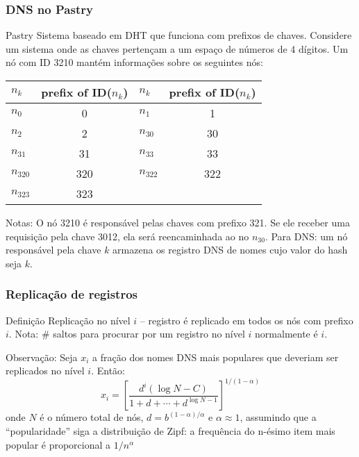 \documentclass[Ligatures=TeX,table,brazil,svgnames,usetotalslideindicator,compress,10pt]{beamer}
\begin{document}
\begin{frame}
  \frametitle{DNS no Pastry}
  \begin{block}{Pastry}
    Sistema baseado em DHT que funciona com \alert{prefixos} de chaves. Considere um sistema onde as chaves pertençam a um espaço de números de 4 dígitos. Um nó com ID 3210 mantém informações sobre os seguintes nós:
  \end{block}
  \begin{center}\footnotesize
      \begin{tabular}{lclc} \\
        $n_k$ & prefix of ID($n_k$) &         $n_k$ & prefix of ID($n_k$) \\ \hline
        $n_0$ & 0  &
        $n_1$ &  1  \\
        $n_2$ &  2  &
        $n_{30}$ &  30  \\
        $n_{31}$ &  31  &
        $n_{33}$ &  33  \\
        $n_{320}$ &  320  &
        $n_{322}$ &  322  \\
        $n_{323}$ &  323 & \\
      \end{tabular}
    \end{center}


  \begin{alertblock}{Notas:}
    O nó 3210 é responsável pelas chaves com prefixo 321. Se ele receber uma requisição pela chave 3012, ela será reencaminhada ao no $n_{30}$. Para DNS: um nó responsável pela chave $k$ armazena os registro DNS de nomes cujo valor do hash seja $k$.
  \end{alertblock}
\end{frame}

\begin{frame}
  \frametitle{Replicação de registros}
  \begin{block}{Definição}
    \alert{Replicação no nível $i$} -- registro é replicado em todos os nós com prefixo $i$. \alert{Nota:} \# saltos para procurar por um registro no  nível $i$ normalmente é $i$.
  \end{block}

  \begin{block}{Observação:}
    Seja $x_i$ a fração dos nomes DNS mais populares que deveriam ser replicados no nível $i$. Então:
     \[x_i = \left [ \frac{d^i ( \log N - C )}{1 + d + \cdots + d^{\log N - 1}} \right ]^{1/(1-\alpha)}\]
     onde $N$ é o número total de nós, $d = b^{(1-\alpha)/\alpha}$ e $\alpha \approx 1$, assumindo que a ``popularidade'' siga a distribuição de Zipf: a frequência do n-ésimo item mais popular é proporcional a $1/n^\alpha$
  \end{block}
\end{frame}
\end{document}
